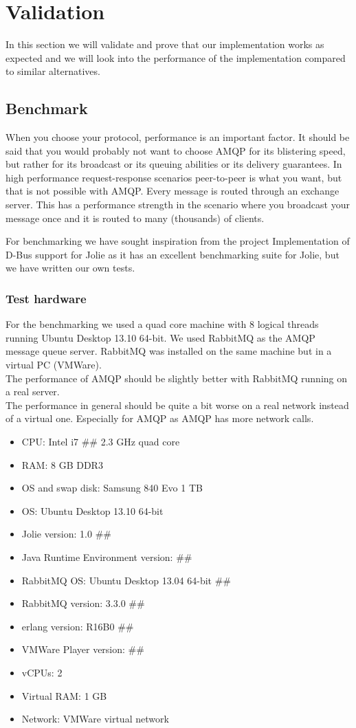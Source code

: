 \section{Validation}
In this section we will validate and prove that our implementation works as expected and we will look into the performance of the implementation compared to similar alternatives.
\subsection{Benchmark}
When you choose your protocol, performance is an important factor. It should be said that you would probably not want to choose AMQP for its blistering speed, but rather for its broadcast or its queuing abilities or its delivery guarantees. In high performance request-response scenarios peer-to-peer is what you want, but that is not possible with AMQP. Every message is routed through an exchange server. This has a performance strength in the scenario where you broadcast your message once and it is routed to many (thousands) of clients.

For benchmarking we have sought inspiration from the project Implementation of D-Bus support for Jolie\cite{D-Bus} as it has an excellent benchmarking suite for Jolie, but we have written our own tests.
\subsubsection{Test hardware}
For the benchmarking we used a quad core machine with 8 logical threads running Ubuntu Desktop 13.10 64-bit. We used RabbitMQ as the AMQP message queue server. RabbitMQ was installed on the same machine but in a virtual PC (VMWare).\\
The performance of AMQP should be slightly better with RabbitMQ running on a real server.\\
The performance in general should be quite a bit worse on a real network instead of a virtual one. Especially for AMQP as AMQP has more network calls.
\begin{itemize}
\item CPU: Intel i7 \#\# 2.3 GHz quad core
\item RAM: 8 GB DDR3
\item OS and swap disk: Samsung 840 Evo 1 TB
\item OS: Ubuntu Desktop 13.10 64-bit
\item Jolie version: 1.0 \#\#
\item Java Runtime Environment version: \#\#
\item RabbitMQ OS: Ubuntu Desktop 13.04 64-bit \#\#
\item RabbitMQ version: 3.3.0 \#\#
\item erlang version: R16B0 \#\#
\item VMWare Player version: \#\#
\item vCPUs: 2
\item Virtual RAM: 1 GB
\item Network: VMWare virtual network
\end{itemize}
